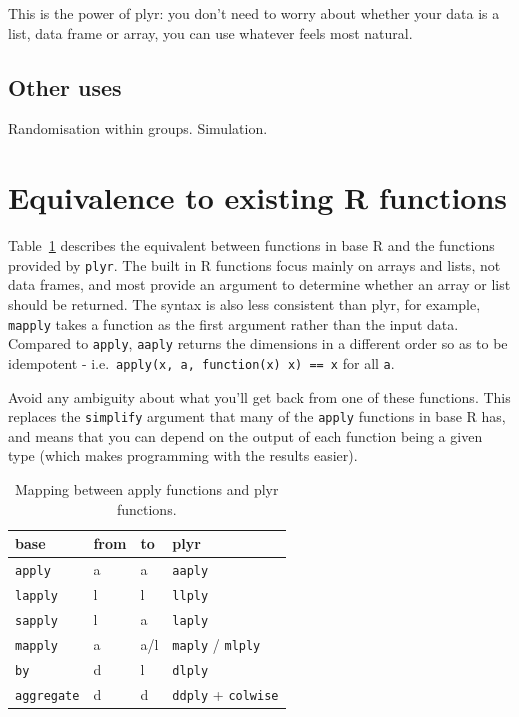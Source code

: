 \documentclass{scrartcl}
\newcommand{\code}[1]{\lstinline!#1!}
\begin{document}
This is the power of plyr: you don't need to worry about whether your data is a list, data frame or array, you can use whatever feels most natural.

\subsection{Other uses}

Randomisation within groups.  Simulation.

\section{Equivalence to existing R functions}
\label{sec:equiv}

Table~\ref{tbl:equiv} describes the equivalent between functions in base R and 
the functions provided by {\tt plyr}.  The built in R functions focus mainly on arrays and lists, not data frames, and most provide an argument to determine whether an array or list should be returned.  The syntax is also less consistent than plyr, for example, {\tt mapply} takes a function as the first argument rather than the input data.  Compared to {\tt apply}, {\tt aaply} returns the dimensions in a different order so as to be idempotent - i.e.\ {\tt apply(x, a, function(x) x) == x} for all {\tt a}. 

Avoid any ambiguity about what you'll get back from one of these functions. This replaces the {\tt simplify} argument that many of the {\tt apply} functions in base R has, and means that you can depend on the output of each function being a given type (which makes programming with the results easier).


\begin{table}[htpb]
  \begin{center}
  \begin{tabular}{llll}
    \toprule
    base & from & to & plyr \\
    \midrule
    \code{apply }    & a & a   & \code{aaply} \\
    \code{lapply}    & l & l   & \code{llply} \\
    \code{sapply}    & l & a   & \code{laply} \\
    \code{mapply}    & a & a/l & \code{maply} / \code{mlply} \\
    \code{by}        & d & l   & \code{dlply} \\
    \code{aggregate} & d & d   & \code{ddply} + \code{colwise} \\
    \bottomrule
  \end{tabular}
  \end{center}
  \caption{Mapping between apply functions and plyr functions.}
  \label{tbl:equiv}
\end{table}
\end{document}
